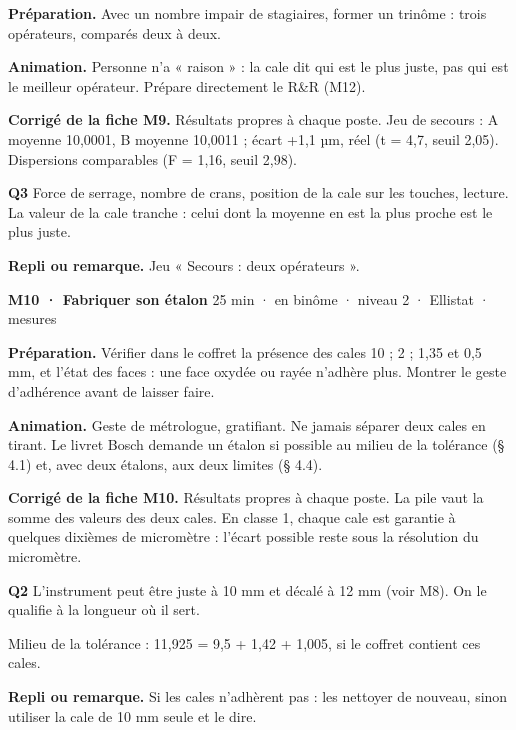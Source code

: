 \textbf{Préparation.} Avec un nombre impair de stagiaires, former un trinôme : trois opérateurs, comparés deux à deux.\par
\textbf{Animation.} Personne n'a « raison » : la cale dit qui est le plus juste, pas qui est le meilleur opérateur. Prépare directement le R\&R (M12).\par
\textbf{\color{ok}Corrigé de la fiche M9.} Résultats propres à chaque poste. Jeu de secours : A moyenne 10,0001, B moyenne 10,0011 ; écart +1,1 µm, réel (t = 4,7, seuil 2,05). Dispersions comparables (F = 1,16, seuil 2,98).\par \textbf{Q3} Force de serrage, nombre de crans, position de la cale sur les touches, lecture. La valeur de la cale tranche : celui dont la moyenne en est la plus proche est le plus juste.\par
{\small\textbf{Repli ou remarque.} Jeu « Secours : deux opérateurs ».}\par
\vspace{3pt}
\begin{tcolorbox}[act]\textbf{M10 · Fabriquer son étalon} \hfill {\small 25 min · en binôme · niveau 2 · Ellistat · mesures}\end{tcolorbox}
\textbf{Préparation.} Vérifier dans le coffret la présence des cales 10 ; 2 ; 1,35 et 0,5 mm, et l'état des faces : une face oxydée ou rayée n'adhère plus. Montrer le geste d'adhérence avant de laisser faire.\par
\textbf{Animation.} Geste de métrologue, gratifiant. Ne jamais séparer deux cales en tirant. Le livret Bosch demande un étalon si possible au milieu de la tolérance (§ 4.1) et, avec deux étalons, aux deux limites (§ 4.4).\par
\textbf{\color{ok}Corrigé de la fiche M10.} Résultats propres à chaque poste. La pile vaut la somme des valeurs des deux cales. En classe 1, chaque cale est garantie à quelques dixièmes de micromètre : l'écart possible reste sous la résolution du micromètre.\par \textbf{Q2} L'instrument peut être juste à 10 mm et décalé à 12 mm (voir M8). On le qualifie à la longueur où il sert.\par Milieu de la tolérance : 11,925 = 9,5 + 1,42 + 1,005, si le coffret contient ces cales.\par
{\small\textbf{Repli ou remarque.} Si les cales n'adhèrent pas : les nettoyer de nouveau, sinon utiliser la cale de 10 mm seule et le dire.}\par
\vspace{3pt}
